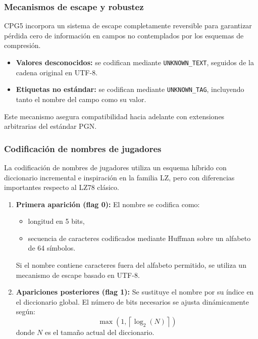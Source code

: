 \documentclass[11pt, letterpaper]{article}
\begin{document}
\subsubsection{Mecanismos de escape y robustez}

CPG5 incorpora un sistema de escape completamente reversible para garantizar pérdida cero de información en campos no contemplados por los esquemas de compresión.

\begin{itemize}
    \item \textbf{Valores desconocidos:} se codifican mediante \texttt{UNKNOWN\_TEXT}, seguidos de la cadena original en UTF-8.
    \item \textbf{Etiquetas no estándar:} se codifican mediante \texttt{UNKNOWN\_TAG}, incluyendo tanto el nombre del campo como su valor.
\end{itemize}

Este mecanismo asegura compatibilidad hacia adelante con extensiones arbitrarias del estándar PGN.

\subsubsection{Codificación de nombres de jugadores}

La codificación de nombres de jugadores utiliza un esquema híbrido con diccionario incremental e inspiración en la familia LZ, pero con diferencias importantes respecto al LZ78 clásico.

\begin{enumerate}
    \item \textbf{Primera aparición (flag 0):}
    El nombre se codifica como:
    \begin{itemize}
        \item longitud en 5 bits,
        \item secuencia de caracteres codificados mediante Huffman sobre un alfabeto de 64 símbolos.
    \end{itemize}
    Si el nombre contiene caracteres fuera del alfabeto permitido, se utiliza un mecanismo de escape basado en UTF-8.

    \item \textbf{Apariciones posteriores (flag 1):}
    Se sustituye el nombre por su índice en el diccionario global. El número de bits necesarios se ajusta dinámicamente según:
    \[
    \max\left(1, \left\lceil \log_2(N) \right\rceil\right)
    \]
    donde $N$ es el tamaño actual del diccionario.
\end{enumerate}
\end{document}
